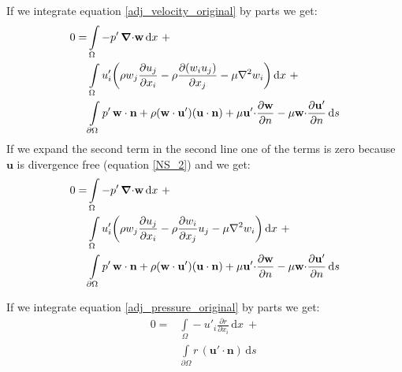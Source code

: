 \documentclass[12pt, a4paper]{article}
\begin{document}
    If we integrate equation \ref{adj_velocity_original} by parts we get:
    \begin{equation}
    \begin{split}
        0 = &\int\limits_{\Omega}
            -p' \, \boldsymbol{\nabla} \mathbf{\cdot w}
        \, \mathrm{d}x \ + \\
        &\int\limits_{\Omega} u'_i \bigg{(}
            \rho w_j \frac{\partial u_j}{\partial x_i} - 
            \rho \frac{\partial (w_i u_j)}{\partial x_j} - 
            \mu \nabla^2 w_i
        \bigg{)} \, \mathrm{d}x \ + \\
        &\int\limits_{\partial \Omega}
            p' \, \mathbf{w \cdot n} + 
            \rho (\mathbf{w \cdot u'}) (\mathbf{u \cdot n}) + 
            \mu \mathbf{u' \cdot} \frac{\partial \mathbf{w}}{\partial n} - 
            \mu \mathbf{w \cdot} \frac{\partial \mathbf{u'}}{\partial n}
        \, \mathrm{d}s
    \end{split}
    \end{equation}
    If we expand the second term in the second line one of the terms is zero because $\mathbf{u}$ is divergence free (equation \ref{NS_2}) and we get:
    \begin{equation} \label{adj_velocity_parts}
    \begin{split}
        0 = &\int\limits_{\Omega}
            -p' \, \boldsymbol{\nabla} \mathbf{\cdot w}
        \, \mathrm{d}x \ + \\
        &\int\limits_{\Omega} u'_i \bigg{(}
            \rho w_j \frac{\partial u_j}{\partial x_i} - 
            \rho \frac{\partial w_i}{\partial x_j} u_j - 
            \mu \nabla^2 w_i
        \bigg{)} \, \mathrm{d}x \ + \\
        &\int\limits_{\partial \Omega}
            p' \, \mathbf{w \cdot n} + 
            \rho (\mathbf{w \cdot u'}) (\mathbf{u \cdot n}) + 
            \mu \mathbf{u' \cdot} \frac{\partial \mathbf{w}}{\partial n} - 
            \mu \mathbf{w \cdot} \frac{\partial \mathbf{u'}}{\partial n}
        \, \mathrm{d}s
    \end{split}
    \end{equation}
    
    If we integrate equation \ref{adj_pressure_original} by parts we get:
    \begin{equation} \label{adj_pressure_parts}
    \begin{split}
        0 = &\int\limits_{\Omega}
            - u'_i \frac{\partial r}{\partial x_i}
        \, \mathrm{d}x \ + \\
        &\int\limits_{\partial \Omega}
            r \, (\mathbf{u' \cdot n})
        \, \mathrm{d}s
    \end{split}
    \end{equation}
    
\end{document}
